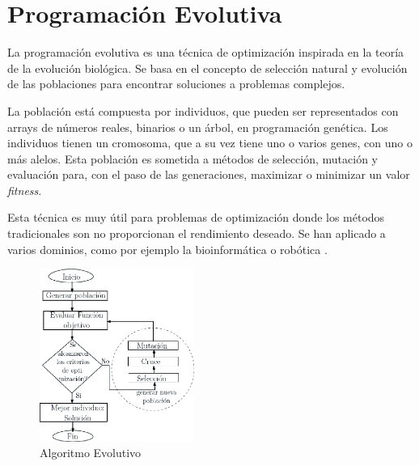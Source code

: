 \section{Programación Evolutiva}


	La programación evolutiva es una técnica de optimización inspirada en la teoría de la evolución biológica. Se basa en el concepto de selección natural y evolución de las poblaciones para encontrar soluciones a problemas complejos. 
	
	La población está compuesta por individuos, que pueden ser representados con arrays de números reales, binarios o un árbol, en programación genética. Los individuos tienen un cromosoma, que a su vez tiene uno o varios genes, con uno o más alelos. Esta población es sometida a métodos de selección, mutación y evaluación para, con el paso de las generaciones, maximizar o minimizar un valor \textit{fitness}.
	
	Esta técnica es muy útil para problemas de optimización donde los métodos tradicionales son no proporcionan el rendimiento deseado.  Se han aplicado a varios dominios, como por ejemplo la bioinformática o robótica \cite{contreras2015mobile}.


	\begin{figure}[!h]
		\centering
		\includegraphics[width=0.45\textwidth]{images/chapter_2/AG}
		\caption{Algoritmo Evolutivo}
		\label{fig:AG}
	\end{figure}




